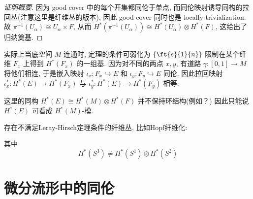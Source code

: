 \begin{proof}[证明概要]
        因为 good cover 中的每个开集都同伦于单点, 
        而同伦映射诱导同构的拉回丛(注意这里是纤维丛的版本), 
        因此 good cover 同时也是 locally trivialization.
        故 $\pi^{-1}(U_\alpha)\cong U_{\alpha}\times F$, 
        从而 $H^*(\pi^{-1}(U_\alpha))\cong H^*(U_{\alpha})\otimes H^*(F)$, 
        这给出了归纳奠基.
    \end{proof}
    \begin{remark}
        实际上当底空间 $M$ 连通时, 定理的条件可弱化为 $\{\ft{e}{1}{n}\}$ 
        限制在某个纤维 $F_x$ 上得到 $H^*(F_x)$ 的一组基. 
        因为对不同的两点 $x,y$, 有道路 $\gamma:[0,1]\rightarrow M$ 将他们相连, 
        于是嵌入映射 
        $\iota_x:F_x\hookrightarrow E$ 和 $\iota_y:F_y\hookrightarrow E$ 
        同伦.
        因此拉回映射 $\iota^*_x:H^*(E)\rightarrow H^*(F_x)$ 
        与 $\iota^*_y:H^*(E)\rightarrow H^*(F_y)$ 相等.
    \end{remark}
    \begin{remark}
        这里的同构 $H^*(E)\cong H^*(M)\otimes H^*(F)$ 并不保持环结构(例如？)
        因此只能说 $H^*(E)$ 可看成 $H^*(M)$-模.
    \end{remark}
    \begin{remark}
        存在不满足{\rm Leray-Hirsch}定理条件的纤维丛, 比如{\rm Hopf}纤维化:
        \begin{center}
        \end{center}
        其中
        \begin{equation*}
            H^*(S^3)\neq H^*(S^1)\otimes H^*(S^2)
        \end{equation*}
    \end{remark}

    \section{微分流形中的同伦}

